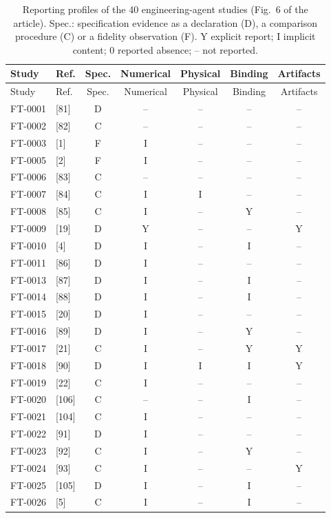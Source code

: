 \begin{longtable}{@{}llccccc@{}}
\caption{Reporting profiles of the 40 engineering-agent studies (Fig.~6 of the article). Spec.: specification evidence as a declaration (D), a comparison procedure (C) or a fidelity observation (F). Y explicit report; I implicit content; 0 reported absence; -- not reported.}\label{tab:S9.3}\\
\toprule
Study & Ref. & Spec. & Numerical & Physical & Binding & Artifacts \\
\midrule
\endfirsthead
\toprule
Study & Ref. & Spec. & Numerical & Physical & Binding & Artifacts \\
\midrule
\endhead
\bottomrule
\endlastfoot
FT-0001 & [81] & D & -- & -- & -- & -- \\
FT-0002 & [82] & C & -- & -- & -- & -- \\
FT-0003 & [1] & F & I & -- & -- & -- \\
FT-0005 & [2] & F & I & -- & -- & -- \\
FT-0006 & [83] & C & -- & -- & -- & -- \\
FT-0007 & [84] & C & I & I & -- & -- \\
FT-0008 & [85] & C & I & -- & Y & -- \\
FT-0009 & [19] & D & Y & -- & -- & Y \\
FT-0010 & [4] & D & I & -- & I & -- \\
FT-0011 & [86] & D & I & -- & -- & -- \\
FT-0013 & [87] & D & I & -- & I & -- \\
FT-0014 & [88] & D & I & -- & I & -- \\
FT-0015 & [20] & D & I & -- & -- & -- \\
FT-0016 & [89] & D & I & -- & Y & -- \\
FT-0017 & [21] & C & I & -- & Y & Y \\
FT-0018 & [90] & D & I & I & I & Y \\
FT-0019 & [22] & C & I & -- & -- & -- \\
FT-0020 & [106] & C & -- & -- & I & -- \\
FT-0021 & [104] & C & I & -- & -- & -- \\
FT-0022 & [91] & D & I & -- & -- & -- \\
FT-0023 & [92] & C & I & -- & Y & -- \\
FT-0024 & [93] & C & I & -- & -- & Y \\
FT-0025 & [105] & D & I & -- & I & -- \\
FT-0026 & [5] & C & I & -- & I & -- \\

\end{longtable}
